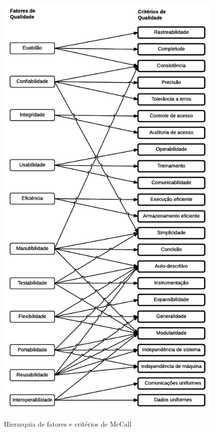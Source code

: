 \documentclass[
	12pt,				%
	openright,			%
	oneside,			%
	a4paper,			%
	english,			%
	brazil,				%
	]{abntex2}
\begin{document}
\begin{figure}[H]
    \centering
    \caption{Hierarquia de fatores e critérios de McCall}
    \graphicspath{ {./graphics/} }
    \includegraphics[scale=0.85]{mcCall-graph-andrei}
    \label{fig:mcCall-quality_model}
\end{figure}
\end{document}
